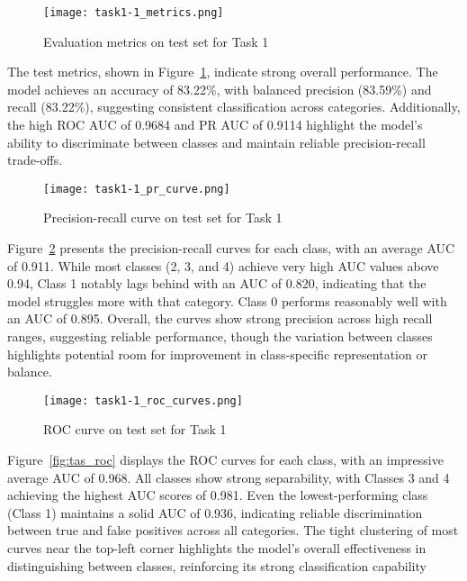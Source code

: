 \documentclass[10pt,a4paper,twoside]{article}
\begin{document}
\begin{figure}[h]
    \centering
    \texttt{[image: task1-1\_metrics.png]} 
    \caption{Evaluation metrics on test set for Task 1}
    \label{fig:task1_metrics}
\end{figure}

The test metrics, shown in Figure~\ref{fig:task1_metrics}, indicate strong overall performance. The model achieves an accuracy of 83.22\%, with balanced precision (83.59\%) and recall (83.22\%), suggesting consistent classification across categories. Additionally, the high ROC AUC of 0.9684 and PR AUC of 0.9114 highlight the model’s ability to discriminate between classes and maintain reliable precision-recall trade-offs.

\begin{figure}[h]
    \centering
    \texttt{[image: task1-1\_pr\_curve.png]} 
    \caption{Precision-recall curve on test set for Task 1}
    \label{fig:task1_pr}
\end{figure}

Figure~\ref{fig:task1_pr} presents the precision-recall curves for each class, with an average AUC of 0.911. While most classes (2, 3, and 4) achieve very high AUC values above 0.94, Class 1 notably lags behind with an AUC of 0.820, indicating that the model struggles more with that category. Class 0 performs reasonably well with an AUC of 0.895. Overall, the curves show strong precision across high recall ranges, suggesting reliable performance, though the variation between classes highlights potential room for improvement in class-specific representation or balance.

\begin{figure}[h]
    \centering
    \texttt{[image: task1-1\_roc\_curves.png]} 
    \caption{ROC curve on test set for Task 1}
    \label{fig:task1_roc}
\end{figure}

Figure~\ref{fig:tas_roc} displays the ROC curves for each class, with an impressive average AUC of 0.968. All classes show strong separability, with Classes 3 and 4 achieving the highest AUC scores of 0.981. Even the lowest-performing class (Class 1) maintains a solid AUC of 0.936, indicating reliable discrimination between true and false positives across all categories. The tight clustering of most curves near the top-left corner highlights the model’s overall effectiveness in distinguishing between classes, reinforcing its strong classification capability
\end{document}
